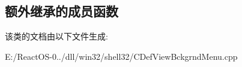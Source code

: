 \subsection*{额外继承的成员函数}


该类的文档由以下文件生成\+:\begin{DoxyCompactItemize}
\item 
E\+:/\+React\+O\+S-\/0../dll/win32/shell32/C\+Def\+View\+Bckgrnd\+Menu.\+cpp\end{DoxyCompactItemize}
